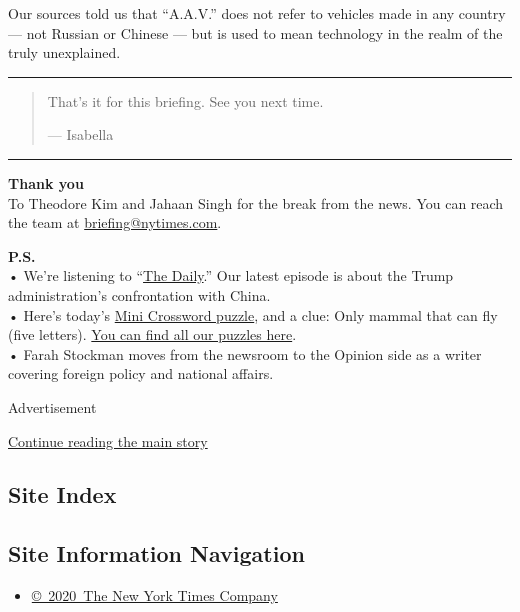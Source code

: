 Our sources told us that ``A.A.V.'' does not refer to vehicles made in
any country --- not Russian or Chinese --- but is used to mean
technology in the realm of the truly unexplained.

\begin{center}\rule{0.5\linewidth}{\linethickness}\end{center}

\begin{quote}
That's it for this briefing. See you next time.

--- Isabella
\end{quote}

\begin{center}\rule{0.5\linewidth}{\linethickness}\end{center}

\textbf{Thank you}\\
To Theodore Kim and Jahaan Singh for the break from the news. You can
reach the team at
\href{mailto:briefing+midnight@nytimes.com?subject=Briefing\%20Feedback}{briefing@nytimes.com}.

\textbf{P.S.}\\
• We're listening to ``\href{https://www.nytimes.com/thedaily}{The
Daily}.'' Our latest episode is about the Trump administration's
confrontation with China.\\
• Here's today's
\href{https://www.nytimes.com/crosswords/game/mini}{Mini Crossword
puzzle}, and a clue: Only mammal that can fly (five letters).
\href{https://www.nytimes.com/crosswords}{You can find all our puzzles
here}.\\
• Farah Stockman moves from the newsroom to the Opinion side as a writer
covering foreign policy and national affairs.

Advertisement

\protect\hyperlink{after-bottom}{Continue reading the main story}

\hypertarget{site-index}{%
\subsection{Site Index}\label{site-index}}

\hypertarget{site-information-navigation}{%
\subsection{Site Information
Navigation}\label{site-information-navigation}}

\begin{itemize}
\tightlist
\item
  \href{https://help.nytimes.com/hc/en-us/articles/115014792127-Copyright-notice}{©~2020~The
  New York Times Company}
\end{itemize}

